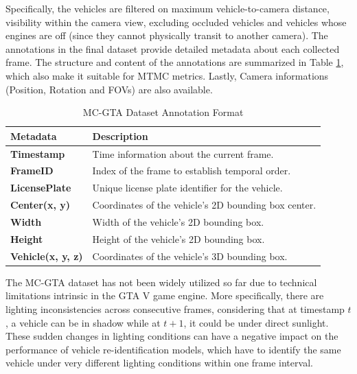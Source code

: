 Specifically, the vehicles are filtered on maximum vehicle-to-camera distance, visibility within the camera view, excluding occluded vehicles and vehicles whose engines are off (since they cannot physically transit to another camera). The annotations in the final dataset provide detailed metadata about each collected frame. The structure and content of the annotations are summarized in Table \ref{table:mcgta_annotations}, which also make it suitable for MTMC metrics. Lastly, Camera informations (Position, Rotation and FOVs) are also available. 

\begin{table}[ht]
    \centering
    \caption{MC-GTA Dataset Annotation Format}
    \begin{tabular}{|l|p{10cm}|}
    \hline
    \textbf{Metadata}        & \textbf{Description}                                              \\ \hline
    \textbf{Timestamp}       & Time information about the current frame.                         \\ \hline
    \textbf{FrameID}         & Index of the frame to establish temporal order.                   \\ \hline
    \textbf{LicensePlate}    & Unique license plate identifier for the vehicle.                  \\ \hline
    \textbf{Center(x, y)}    & Coordinates of the vehicle's 2D bounding box center.              \\ \hline
    \textbf{Width}           & Width of the vehicle's 2D bounding box.                           \\ \hline
    \textbf{Height}          & Height of the vehicle's 2D bounding box.                          \\ \hline
    \textbf{Vehicle(x, y, z)} & Coordinates of the vehicle's 3D bounding box.                    \\ \hline
    \end{tabular}
    \label{table:mcgta_annotations}
\end{table}

The MC-GTA dataset has not been widely utilized so far due to technical limitations intrinsic in the GTA V game engine. More specifically, there are lighting inconsistencies across consecutive frames, considering that at timestamp $t$, a vehicle can be in shadow while at $t+1$, it could be under direct sunlight. These sudden changes in lighting conditions can have a negative impact on the performance of vehicle re-identification models, which have to identify the same vehicle under very different lighting conditions within one frame interval.

